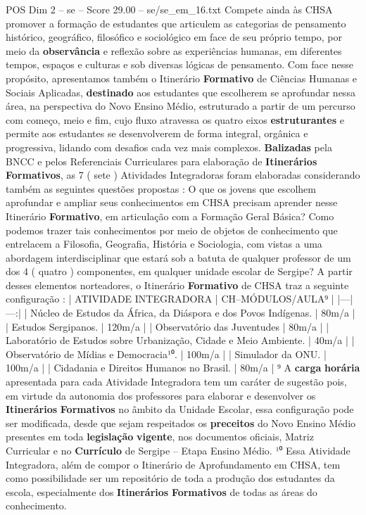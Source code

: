 \begin{textsample}{POS Dim 2 – se – Score 29.00 – se/se\_em\_16.txt}
Compete ainda às CHSA promover a formação de estudantes que articulem as categorias de pensamento histórico, geográfico, filosófico e sociológico em face de seu próprio tempo, por meio da \textbf{observância} e reflexão sobre as experiências humanas, em diferentes tempos, espaços e culturas e sob diversas lógicas de pensamento.
Com face nesse propósito, apresentamos também o Itinerário \textbf{Formativo} de Ciências Humanas e Sociais Aplicadas, \textbf{destinado} aos estudantes que escolherem se aprofundar nessa área, na perspectiva do Novo Ensino Médio, estruturado a partir de um percurso com começo, meio e fim, cujo fluxo atravessa os quatro eixos \textbf{estruturantes} e permite aos estudantes se desenvolverem de forma integral, orgânica e progressiva, lidando com desafios cada vez mais complexos. \textbf{Balizadas} pela BNCC e pelos Referenciais Curriculares para elaboração de \textbf{Itinerários} \textbf{Formativos}, as 7 ( sete ) Atividades Integradoras foram elaboradas considerando também as seguintes questões propostas : O que os jovens que escolhem aprofundar e ampliar seus conhecimentos em CHSA precisam aprender nesse Itinerário \textbf{Formativo}, em articulação com a Formação Geral Básica?
Como podemos trazer tais conhecimentos por meio de objetos de conhecimento que entrelacem a Filosofia, Geografia, História e Sociologia, com vistas a uma abordagem interdisciplinar que estará sob a batuta de qualquer professor de um dos 4 ( quatro ) componentes, em qualquer unidade escolar de Sergipe?
A partir desses elementos norteadores, o Itinerário \textbf{Formativo} de CHSA traz a seguinte configuração : | ATIVIDADE INTEGRADORA | CH–MÓDULOS/AULA⁹ | |---|---:| | Núcleo de Estudos da África, da Diáspora e dos Povos Indígenas. | 80m/a | | Estudos Sergipanos. | 120m/a | | Observatório das Juventudes | 80m/a | | Laboratório de Estudos sobre Urbanização, Cidade e Meio Ambiente. | 40m/a | | Observatório de Mídias e Democracia¹⁰. | 100m/a | | Simulador da ONU. | 100m/a | | Cidadania e Direitos Humanos no Brasil. | 80m/a | ⁹ A \textbf{carga} \textbf{horária} apresentada para cada Atividade Integradora tem um caráter de sugestão pois, em virtude da autonomia dos professores para elaborar e desenvolver os \textbf{Itinerários} \textbf{Formativos} no âmbito da Unidade Escolar, essa configuração pode ser modificada, desde que sejam respeitados os \textbf{preceitos} do Novo Ensino Médio presentes em toda \textbf{legislação} \textbf{vigente}, nos documentos oficiais, Matriz Curricular e no \textbf{Currículo} de Sergipe – Etapa Ensino Médio. ¹⁰ Essa Atividade Integradora, além de compor o Itinerário de Aprofundamento em CHSA, tem como possibilidade ser um repositório de toda a produção dos estudantes da escola, especialmente dos \textbf{Itinerários} \textbf{Formativos} de todas as áreas do conhecimento.

\end{textsample}
